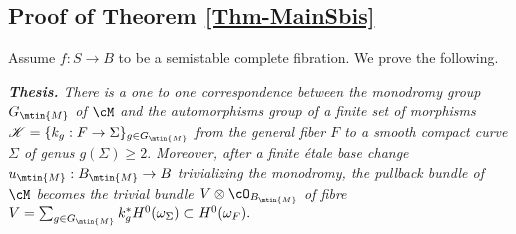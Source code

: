 \documentclass[a4paper,11pt]{amsart}
\begin{document}
{\subsection*{Proof of Theorem \ref{Thm-MainSbis}}
 						
						Assume $f:S\to B$ to be a semistable complete fibration. We prove the following.
 						
 						{\em {\bf Thesis.} There is a one to one correspondence between the monodromy group $G_{\mtin{M}}$ of $\cM$ and the automorphisms group of a finite set of morphisms $\mathscr{K}=\{k_g:F\to \Sigma\}_{g\in G_{\mtin{M}}}$ from the general fiber $F$ to a smooth compact curve $\Sigma$ of genus $g(\Sigma)\geq 2.$  Moreover, after a finite \'{e}tale base change $u_{\mtin{M}}:B_{\mtin{M}}\to B$ trivializing the monodromy, the pullback bundle of $\cM$ becomes the trivial bundle $V\otimes \cO_{B_{\mtin{M}}}$ of fibre $V=\sum_{g\in G_{\mtin{M}}} k_g^*H^0(\omega_{\Sigma})\subset H^0(\omega_F).$ }
% 						
 						
% 						
 						
}
\end{document}

